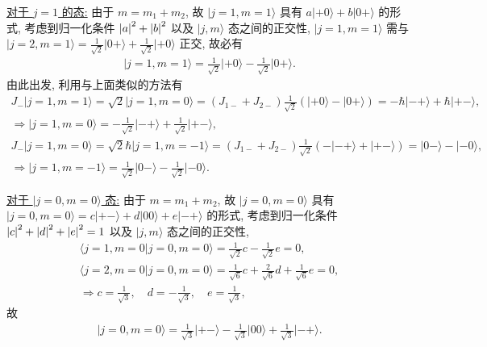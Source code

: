 \documentclass{assignment}
\begin{document}
\begin{sol}
    \uline{对于 $j=1$ 的态:} 由于 $m=m_1+m_2$, 故 $\lvert j=1,m=1\rangle$ 具有 $a\lvert+0\rangle+b\lvert 0+\rangle$ 的形式, 考虑到归一化条件 $\left\lvert a\right\rvert^2+\left\lvert b\right\rvert^2$ 以及 $\lvert j,m\rangle$ 态之间的正交性, $\lvert j=1,m=1\rangle$ 需与 $\lvert j=2,m=1\rangle=\frac{1}{\sqrt{2}}\lvert 0+\rangle+\frac{1}{\sqrt{2}}\lvert+0\rangle$ 正交, 故必有
    \begin{align}
        \lvert j=1,m=1\rangle=\frac{1}{\sqrt{2}}\lvert+0\rangle-\frac{1}{\sqrt{2}}\lvert 0+\rangle.
    \end{align}
    由此出发, 利用与上面类似的方法有
    \begin{gather}
        J_-\lvert j=1,m=1\rangle=\sqrt{2}\lvert j=1,m=0\rangle=(J_{1-}+J_{2-})\frac{1}{\sqrt{2}}(\lvert+0\rangle-\lvert 0+\rangle)=-\hbar\lvert-+\rangle+\hbar\lvert+-\rangle,\\
        \Longrightarrow\lvert j=1,m=0\rangle=-\frac{1}{\sqrt{2}}\lvert-+\rangle+\frac{1}{\sqrt{2}}\lvert+-\rangle,\\
        J_-\lvert j=1,m=0\rangle=\sqrt{2}\hbar\lvert j=1,m=-1\rangle=(J_{1-}+J_{2-})\frac{1}{\sqrt{2}}(-\lvert-+\rangle+\lvert+-\rangle)=\lvert 0-\rangle-\lvert-0\rangle,\\
        \Longrightarrow\lvert j=1,m=-1\rangle=\frac{1}{\sqrt{2}}\lvert 0-\rangle-\frac{1}{\sqrt{2}}\lvert-0\rangle.
    \end{gather}

    \uline{对于 $\lvert j=0,m=0\rangle$ 态:} 由于 $m=m_1+m_2$, 故 $\lvert j=0,m=0\rangle$ 具有 $\lvert j=0,m=0\rangle=c\lvert+-\rangle+d\lvert 00\rangle+e\lvert-+\rangle$ 的形式, 考虑到归一化条件 $\left\lvert c\right\rvert^2+\left\lvert d\right\rvert^2+\left\lvert e\right\rvert^2=1$ 以及 $\lvert j,m\rangle$ 态之间的正交性,
    \begin{gather}
        \langle j=1,m=0\vert j=0,m=0\rangle=\frac{1}{\sqrt{2}}c-\frac{1}{\sqrt{2}}e=0,\\
        \langle j=2,m=0\vert j=0,m=0\rangle=\frac{1}{\sqrt{6}}c+\frac{2}{\sqrt{6}}d+\frac{1}{\sqrt{6}}e=0,\\
        \Longrightarrow c=\frac{1}{\sqrt{3}},\quad d=-\frac{1}{\sqrt{3}},\quad e=\frac{1}{\sqrt{3}},
    \end{gather}
    故
    \begin{align}
        \lvert j=0,m=0\rangle=\frac{1}{\sqrt{3}}\lvert+-\rangle-\frac{1}{\sqrt{3}}\lvert 00\rangle+\frac{1}{\sqrt{3}}\lvert-+\rangle.
    \end{align}


\end{sol}
\end{document}
